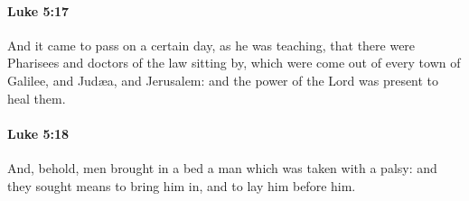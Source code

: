 		\paragraph{Luke 5:17} %
			\label{LUKE-5-17}

			And it came to pass on a certain day, as he was teaching, that there were Pharisees and doctors of the law sitting by, which were come out of every town of Galilee, and Judæa, and Jerusalem: and the power of the Lord was present to heal them.

			\begin{framed}
			\scriptsize
				\begin{compactdesc}
					\item[SBLG] 
				\end{compactdesc}
			\end{framed}

		\paragraph{Luke 5:18} %
			\label{LUKE-5-18}

			And, behold, men brought in a bed a man which was taken with a palsy: and they sought means to bring him in, and to lay him before him.

